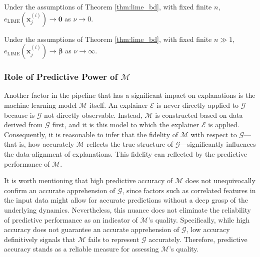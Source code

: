 \documentclass[mnsc,blindrev]{informs3}
\newcommand{\mM}{\mathcal{M}}
\newcommand{\tw}[1]{\textcolor{red}{Tong: #1}}
\begin{document}
            \begin{corollary}
                Under the assumptions of Theorem \ref{thm:lime_bd}, with fixed finite $n$, $e_{\text{LIME}}(\mathbf{x}^{(i)}_j) \rightarrow \mathbf{0}$ as $\nu \rightarrow 0$. 
            \end{corollary}
            
            \begin{corollary}
                Under the assumptions of Theorem \ref{thm:lime_bd}, with fixed finite $n \gg 1$, $e_{\text{LIME}}(\mathbf{x}^{(i)}_j) \rightarrow \boldsymbol{\beta}$ as $\nu\rightarrow \infty$. 
            \end{corollary}

    \subsubsection{Role of Predictive Power of $\mathcal{M}$}
        \label{sec:role_of_predictive_power}
           Another factor in the pipeline that has a significant impact on  explanations is the machine learning model $\mathcal{M}$ itself. 
      An explainer $\mathcal{E}$ is never directly applied to $\mathcal{G}$ because is $\mathcal{G}$ not directly observable. Instead, $\mathcal{M}$ is constructed based on data derived from $\mathcal{G}$ first, and it is this model to which the explainer $\mathcal{E}$ is applied. Consequently, it is reasonable to infer that the fidelity of $\mathcal{M}$ with respect to $\mathcal{G}$—that is, how accurately $\mathcal{M}$ reflects the true structure of $\mathcal{G}$—significantly influences the data-alignment of explanations. This fidelity can reflected by the predictive performance of $\mM$.  

           It is worth mentioning that high predictive accuracy of $\mathcal{M}$ does not unequivocally confirm an accurate apprehension of $\mathcal{G}$, since factors such as correlated features in the input data might allow for accurate predictions without a deep grasp of the underlying dynamics. Nevertheless, this nuance does not eliminate the reliability of predictive performance as an indicator of $\mathcal{M}$'s quality. Specifically, while high accuracy does not guarantee an accurate apprehension of $\mathcal{G}$, low accuracy definitively signals that $\mathcal{M}$ fails to represent $\mathcal{G}$ accurately. Therefore, predictive accuracy stands as a reliable measure for assessing $\mathcal{M}$'s quality.
 
\end{document}
